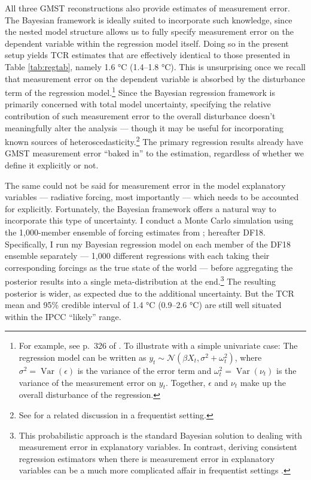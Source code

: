 \documentclass[smallextended]{svjour3}       %
\begin{document}
All three GMST reconstructions also provide estimates of measurement
error. The Bayesian framework is ideally suited to incorporate such
knowledge, since the nested model structure allows us to fully specify
measurement error on the dependent variable within the regression model
itself. Doing so in the present setup yields TCR estimates that are
effectively identical to those presented in Table \ref{tab:regtab},
namely 1.6 °C (1.4--1.8 °C). This is unsurprising once we recall that
measurement error on the dependent variable is absorbed by the
disturbance term of the regression model.\footnote{For example, see
  p.~326 of \cite{greene2007econometric}. To illustrate with a simple
  univariate case: The regression model can be written as
  \(y_t \sim \mathcal{N}(\beta X_t, \sigma^2 + \omega_t^2)\), where
  \(\sigma^2 = \mathop{\mathrm{Var}}(\epsilon)\) is the variance of the
  error term and \(\omega_t^2 = \mathop{\mathrm{Var}}(\nu_t)\) is the
  variance of the measurement error on \(y_t\). Together, \(\epsilon\)
  and \(\nu_t\) make up the overall disturbance of the regression.}
Since the Bayesian regression framework is primarily concerned with
total model uncertainty, specifying the relative contribution of such
measurement error to the overall disturbance doesn't meaningfully alter
the analysis --- though it may be useful for incorporating known sources
of heteroscedasticity.\footnote{See \cite{lewis2005edv} for a related
  discussion in a frequentist setting.} The primary regression results
already have GMST measurement error ``baked in'' to the estimation,
regardless of whether we define it explicitly or not.

The same could not be said for measurement error in the model
explanatory variables --- radiative forcing, most importantly --- which
needs to be accounted for explicitly. Fortunately, the Bayesian
framework offers a natural way to incorporate this type of uncertainty.
I conduct a Monte Carlo simulation using the 1,000-member ensemble of
forcing estimates from \cite{dessler2018ecs}; hereafter DF18.
Specifically, I run my Bayesian regression model on each member of the
DF18 ensemble separately --- 1,000 different regressions with each
taking their corresponding forcings as the true state of the world ---
before aggregating the posterior results into a single meta-distribution
at the end.\footnote{This probabilistic approach is the standard
  Bayesian solution to dealing with measurement error in explanatory
  variables. In contrast, deriving consistent regression estimators when
  there is measurement error in explanatory variables can be a much more
  complicated affair in frequentist settings
  \cite{greene2007econometric}.} The resulting posterior is wider, as
expected due to the additional uncertainty. But the TCR mean and 95\%
credible interval of 1.4 °C (0.9--2.6 °C) are still well situated within
the IPCC ``likely'' range.
\end{document}
